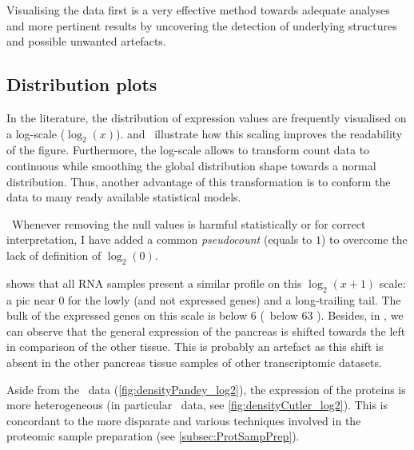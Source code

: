 Visualising the data first is a very effective method towards adequate analyses
and more pertinent results by uncovering
the detection of underlying structures and possible unwanted artefacts.

\subsection{Distribution plots}\label{subsec:distribPlot}

In the literature, the distribution of expression values are frequently
visualised on a log-scale ($\log_{2}(x)$).
 and~ illustrate how
this scaling improves the readability of the figure.
Furthermore, the log-scale allows to transform count data to continuous
while smoothing the global distribution shape towards a normal distribution.
Thus, another advantage of this transformation is to conform the data
to many ready available statistical models.

\NB\ Whenever removing the null values is harmful statistically
or for correct interpretation,
I have added a common \emph{pseudocount} (equals to $1$)
to overcome the lack of definition of $\log_{2}(0)$.

 shows that all \gls{RNA} samples present a similar
profile on this $\log_{2}(x+1)$ scale:
a pic near $0$ for the lowly (and not expressed genes) and a long-trailing tail.
The bulk of the expressed genes on this scale is below $6$ (\ie\ below 63 \FPKM).
Besides, in , we can observe that the general expression
of the pancreas is shifted towards the left in comparison of the other tissue.
This is probably an artefact as this shift is absent in the other pancreas
tissue samples of other transcriptomic datasets.

Aside from the \pandey\ data (\cref{fig:densityPandey_log2}),
the expression of the proteins is more heterogeneous
(in particular \cutler\ data, see \cref{fig:densityCutler_log2}).
This is concordant to the more disparate and various techniques involved in
the proteomic sample preparation (see \cref{subsec:ProtSampPrep}).


